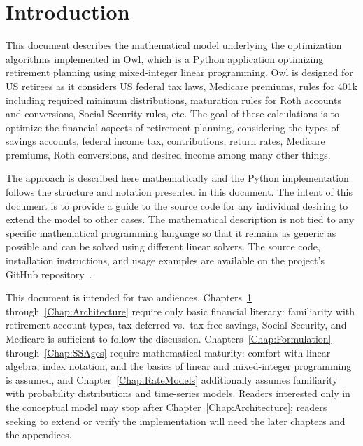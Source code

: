 \documentclass[fleqn,12pt]{report}
\begin{document}
\chapter{Introduction}
\label{Chap:Intro}
This document describes the mathematical model underlying
the optimization algorithms implemented in
Owl, which is a Python application optimizing retirement
planning using mixed-integer linear programming.
Owl is designed for US retirees as it considers US federal tax laws, Medicare premiums,
rules for 401k including required minimum distributions, maturation rules
for Roth accounts and conversions, Social Security rules, etc.
The goal of
these calculations is to optimize the financial aspects
of retirement planning, considering the types of savings accounts,
federal income tax, contributions, return rates, Medicare premiums, Roth conversions,
and desired income among many other things.

The approach is described here mathematically and the Python implementation
follows the structure and notation presented in this document.
The intent of this document is to provide a guide to the source code
for any individual desiring to extend the model to other cases.
The mathematical description is not tied to any specific mathematical
programming language so that it remains as generic as possible and
can be solved using different linear solvers.
The source code, installation instructions, and usage examples are
available on the project's GitHub repository~\cite{owlgithub}.

This document is intended for two audiences.
Chapters~\ref{Chap:Intro} through~\ref{Chap:Architecture} require only basic
financial literacy: familiarity with retirement account types, tax-deferred
vs.\ tax-free savings, Social Security, and Medicare is sufficient to follow the
discussion.
Chapters~\ref{Chap:Formulation} through~\ref{Chap:SSAges} require mathematical
maturity: comfort with linear algebra, index notation, and the basics of linear
and mixed-integer programming is assumed, and
Chapter~\ref{Chap:RateModels} additionally assumes familiarity with probability
distributions and time-series models.
Readers interested only in the conceptual model may stop after
Chapter~\ref{Chap:Architecture}; readers seeking to extend or verify the
implementation will need the later chapters and the appendices.
\end{document}
